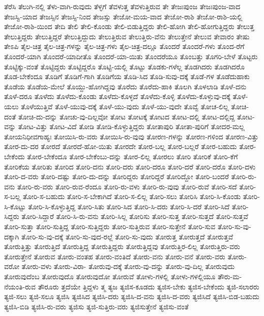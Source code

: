 {ತೆರೆಸಿ
ತೆಲುಗಿ-ನಲ್ಲಿ
ತೆಳು-ವಾಗಿ-ರುವುದು
ತೆಳ್ಳಗೆ
ತೆವಳುತ್ತ
ತೆವಳುತ್ತಿರುವ
ತೇ
ತೇಜಃಪುಂಜ
ತೇಜಃಪುಂಜ-ವಾದ
ತೇಜಸ್ವಿ-ಯಾದ
ತೇಜಸ್ಸಿನ
ತೇಜಸ್ಸಿ-ನಿಂದ
ತೇಜಸ್ಸು
ತೇಜೋ-ಮಯ-ವಾದ
ತೇಜೋ-ರಾಶಿ
ತೇಜೋ-ರಾಶಿ-ಯಲ್ಲಿ
ತೇಜೋ-ರಾಶಿ-ಯಿಂದ
ತೇದಿ
ತೇಲಿ
ತೇಲಿ-ಕೊಂಡು
ತೇಲಿ-ಬಿಡುತ್ತಿದ್ದರು
ತೇಲಿ-ಹೋಗಿ
ತೇಲಿ-ಹೋಗುತ್ತಿದ್ದರು
ತೇಲುತ್ತ
ತೇಲುತ್ತಿದ್ದರು
ತೇಲುತ್ತಿದ್ದರೆ
ತೇಲುತ್ತಿದ್ದುದು
ತೇಲುತ್ತಿರುವ
ತೇಲುತ್ತಿರು-ವೆನು
ತೇಲುತ್ತೇನೆ
ತೇಲುವ
ತೇವಾರಂ
ತೇಷು
ತೇಽಪಿ
ತೈಲ-ಚಿತ್ರ
ತೈಲ-ಚಿತ್ರ-ಗಳನ್ನು
ತೈಲ-ಚಿತ್ರ-ಗಳು
ತೈಲ-ಚಿತ್ರ-ದಲ್ಲೂ
ತೊಂದರೆ
ತೊಂದರೆ-ಗಳು
ತೊಂದ-ರೆಗೆ
ತೊಂದರೆ-ಯಾಗಿ
ತೊಂದರೆ-ಯಾದೀತೊ
ತೊಂದರೆ-ಯಾ-ಯಿತು
ತೊಂದರೆಯೂ
ತೊಂಬತ್ತು
ತೊಗರಿ-ಬೇಳೆ
ತೊಟ್ಟರು
ತೊಟ್ಟಿಕ್ಕು-ವಂತೆ
ತೊಟ್ಟಿದ್ದರು
ತೊಟ್ಟಿದ್ದರೊ
ತೊಟ್ಟಿ-ಯಲ್ಲಿ
ತೊಟ್ಟು
ತೊಡಕು-ಗಳೆಲ್ಲ
ತೊಡಗಿದರು
ತೊಡಗಿದರೊ
ತೊಡ-ಬೇಕೆಂದೂ
ತೊಡಿಗೆ
ತೊಡಿಗೆ-ಗಾಗಿ
ತೊಡಿಗೆಯ
ತೊಡಿ-ಸಿದ
ತೊಡಿ-ಸುವು-ದಕ್ಕೆ
ತೊಡೆ-ಗಳ
ತೊಡೆದುಹಾಕು
ತೊಡೆಯ
ತೊಡೆಯ-ಮೇಲೆ
ತೊಯ್ದು-ಹೋಗಿದ್ದವು
ತೊರೆದು
ತೊರೆದು-ಹಾಕಿ
ತೊಲಗಿ
ತೊಳಲಾಡಿ
ತೊಳೆ-ದನು
ತೊಳೆ-ದರೂ
ತೊಳೆದು
ತೊಳೆದು-ಕೊಂಡು
ತೊಳೆದು-ಕೊಳ್ಳದೆ
ತೊಳೆದು-ಕೊಳ್ಳಿ
ತೊಳೆದು-ಕೊಳ್ಳುವು-ದಕ್ಕೆ
ತೊಳೆ-ಯಲು
ತೊಳೆಯುತ್ತಿವೆ
ತೊಳೆ-ಯುವು-ದಕ್ಕೆ
ತೊಳೆ-ಯು-ವುದು
ತೊಳೆ-ಯು-ವುದೇ
ತೊವ್ವೆ
ತೋಚ-ಲಿಲ್ಲ
ತೋಚಿ-ದಂತೆ
ತೋಚಿ-ದು-ದನ್ನು
ತೋಚು-ವು-ದಿಲ್ಲವೋ
ತೋಟ
ತೋಟಕ್ಕೆ
ತೋಟದ
ತೋಟ-ದಲ್ಲಿ
ತೋಟ-ದಲ್ಲಿದ್ದ
ತೋಟ-ವನ್ನು
ತೋಟ-ವಿತ್ತು
ತೋಟ-ವಿದೆ
ತೋಡಿ
ತೋಡಿ-ಕೊಳ್ಳುತ್ತಿದ್ದರು
ತೋತಾಪುರಿ
ತೋತಾ-ಪುರಿಗೆ
ತೋದರ-ಮಲ್ಲ
ತೋಯನಿಧೀವಗಾಹ್ಯಃ
ತೋಯಿಸಿ-ರು-ವರು
ತೋಯಿಸಿ-ರು-ವುವು
ತೋರಣ-ಗಳನ್ನು
ತೋರಣ-ಗಳಿಂದ
ತೋರಣ-ವಿತ್ತು
ತೋರ-ದು-ದರ
ತೋರದೆ
ತೋರದೆ-ಹೋ-ಯಿತು
ತೋರದೇ
ತೋರ-ಬಲ್ಲ
ತೋರ-ಬಲ್ಲರೆ
ತೋರ-ಬಹುದು
ತೋರ-ಬೇಕೆಂದು
ತೋರ-ಬೇಕೆಂದೂ
ತೋರ-ಬೇಕೆಂಬು-ದನ್ನು
ತೋರ-ಲಿಲ್ಲ
ತೋರಲು
ತೋರಿ
ತೋರಿಕೆ
ತೋರಿ-ಕೆಗೆ
ತೋರಿಕೆಯ
ತೋರಿತು
ತೋರಿದ
ತೋರಿ-ದನು
ತೋರಿ-ದರು
ತೋರಿ-ದರೂ
ತೋರಿ-ದರೆ
ತೋರಿ-ದರೊ
ತೋರಿ-ದಳು
ತೋರಿ-ದ-ವರು
ತೋರಿ-ದಷ್ಟು
ತೋರಿ-ದು-ದನ್ನು
ತೋರಿದ್ದರು
ತೋರಿದ್ದರೆ
ತೋರಿದ್ದೋ
ತೋರಿ-ಬಂದರೆ
ತೋರಿ-ರು-ವನು
ತೋರಿ-ರು-ವರು
ತೋರಿ-ರುವ-ರೆಂದೂ
ತೋರಿ-ರು-ವಳು
ತೋರಿ-ರು-ವುವು
ತೋರಿ-ರುವೆ
ತೋರಿ-ಸದೆ
ತೋರಿ-ಸ-ಬಲ್ಲ
ತೋರಿ-ಸ-ಬಹುದು
ತೋರಿ-ಸ-ಬೇಕಾಗಿದೆ
ತೋರಿ-ಸ-ಲಿಲ್ಲ
ತೋರಿ-ಸಲು
ತೋರಿಸಿ
ತೋರಿ-ಸಿ-ಕೊಂಡು
ತೋರಿ-ಸಿ-ಕೊಟ್ಟು
ತೋರಿ-ಸಿ-ಕೊಳ್ಳುತ್ತಿದ್ದ
ತೋರಿ-ಸಿತು
ತೋರಿ-ಸಿದ
ತೋರಿ-ಸಿ-ದರು
ತೋರಿ-ಸಿ-ದರೆ
ತೋರಿ-ಸಿದೆ
ತೋರಿ-ಸಿದ್ದರು
ತೋರಿ-ಸಿದ್ದಾರೆ
ತೋರಿ-ಸಿ-ರು-ವನು
ತೋರಿ-ಸಿಲ್ಲ
ತೋರಿಸು
ತೋರಿ-ಸುತ್ತ
ತೋರಿ-ಸುತ್ತದೆ
ತೋರಿ-ಸುತ್ತವೆ
ತೋರಿ-ಸುತ್ತಾ
ತೋರಿ-ಸುತ್ತಿದ್ದ
ತೋರಿ-ಸುತ್ತಿದ್ದರು
ತೋರಿ-ಸುತ್ತಿರುವ
ತೋರಿ-ಸುತ್ತೇನೆ
ತೋರಿ-ಸುವ
ತೋರಿ-ಸು-ವು-ದಕ್ಕಾಗಿ
ತೋರಿ-ಸು-ವು-ದಕ್ಕೆ
ತೋರಿ-ಸು-ವುದ-ರಲ್ಲೆ
ತೋರಿ-ಸು-ವುದು
ತೋರುತ್ತ
ತೋರುತ್ತದೆ
ತೋರುತ್ತವೆ
ತೋರುತ್ತಿತ್ತು
ತೋರುತ್ತಿದೆ
ತೋರುತ್ತಿದ್ದ
ತೋರುತ್ತಿದ್ದರು
ತೋರುತ್ತಿದ್ದವು
ತೋರುತ್ತಿರ-ಲಿಲ್ಲ
ತೋರುತ್ತಿರು-ವರು
ತೋರುತ್ತೇನೆ
ತೋರುವ
ತೋರು-ವಂತಹ
ತೋರು-ವಂತಿದೆ
ತೋರು-ವನು
ತೋರು-ವನೆ
ತೋರು-ವರು
ತೋರು-ವರೋ
ತೋರು-ವಳು
ತೋರು-ವಿರಾ-
ತೋರುವು-ದಕ್ಕೆ
ತೋರು-ವು-ದನ್ನು
ತೋರು-ವು-ದಿಲ್ಲ
ತೋರುವುದು
ತೋರುವುದೆಂಬ
ತೋರುವುದೊ
ತೋರುವುದೋ
ತೋರುವೆ
ತೋಳು-ಗಳಲ್ಲಿ
ತೋಳು-ಗಳಲ್ಲಿಯೂ
ತೌರು-ಮ-ನೆಯಂತಿ-ರುವ
ತೌರೂರು
ತ್ತದೆಯೇ
ತ್ತಿದ್ದಳು
ತ್ಮ
ತ್ಯಜ
ತ್ಯಜಿಸ-ಕೂಡದು
ತ್ಯಜಿಸ-ಬೇಕು
ತ್ಯಜಿಸ-ಬೇಕೆಂದು
ತ್ಯಜಿ-ಸಲಾರರು
ತ್ಯಜಿ-ಸಲು
ತ್ಯಜಿ-ಸಲೂ
ತ್ಯಜಿಸಿ
ತ್ಯಜಿಸಿದ
ತ್ಯಜಿಸಿ-ದರು
ತ್ಯಜಿಸಿ-ದ-ವನು
ತ್ಯಜಿಸಿ-ದ-ವರು
ತ್ಯಜಿಸಿದೆ
ತ್ಯಜಿಸಿ-ಬಿಡ-ಬಹುದು
ತ್ಯಜಿಸಿ-ಬಿಡಿ
ತ್ಯಜಿಸಿ-ರು-ವರು
ತ್ಯಜಿಸು
ತ್ಯಜಿ-ಸುತ್ತಿರು-ವರು
ತ್ಯಜಿಸುತ್ತೇನೆ
ತ್ಯಜಿಸು-ವಂತೆ
}
